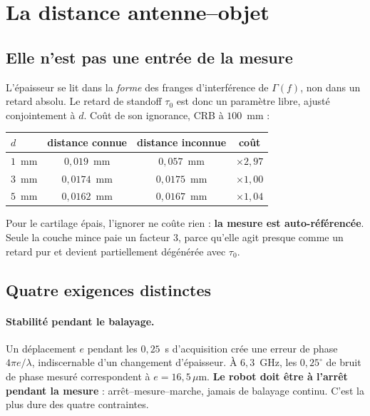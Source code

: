 \documentclass[11pt,a4paper]{article}
\begin{document}
\section{La distance antenne--objet}
\label{sec:standoff}

\subsection{Elle n'est pas une entrée de la mesure}

L'épaisseur se lit dans la \emph{forme} des franges d'interférence de
$\Gamma(f)$, non dans un retard absolu. Le retard de standoff $\tau_0$ est donc
un paramètre libre, ajusté conjointement à $d$. Coût de son ignorance, CRB à
$100$~mm :

\begin{table}[h]
\centering
\begin{tabular}{lccc}
\toprule
$d$ & distance connue & distance inconnue & coût \\
\midrule
$1$~mm & $0{,}019$~mm  & $0{,}057$~mm  & $\times 2{,}97$ \\
$3$~mm & $0{,}0174$~mm & $0{,}0175$~mm & $\times 1{,}00$ \\
$5$~mm & $0{,}0162$~mm & $0{,}0167$~mm & $\times 1{,}04$ \\
\bottomrule
\end{tabular}
\end{table}

Pour le cartilage épais, l'ignorer ne coûte rien : \textbf{la mesure est
auto-référencée}. Seule la couche mince paie un facteur $3$, parce qu'elle agit
presque comme un retard pur et devient partiellement dégénérée avec $\tau_0$.

\subsection{Quatre exigences distinctes}

\paragraph{Stabilité pendant le balayage.} Un déplacement $e$ pendant les
$0{,}25$~s d'acquisition crée une erreur de phase $4\pi e/\lambda$,
indiscernable d'un changement d'épaisseur. À $6{,}3$~GHz, les $0{,}25^\circ$ de
bruit de phase mesuré correspondent à $e = 16{,}5\,\mu$m. \textbf{Le robot doit
être à l'arrêt pendant la mesure} : arrêt--mesure--marche, jamais de balayage
continu. C'est la plus dure des quatre contraintes.
\end{document}
